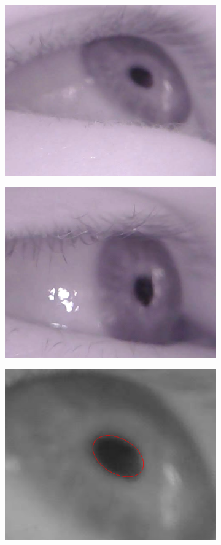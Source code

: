 \begin{figure}[h]
    \centering
    \begin{subfigure}{0.4\textwidth}
        \centering
        \includegraphics[width=0.8\linewidth]{plots/blurred_pupil.png} 
    \end{subfigure}
    \begin{subfigure}{0.4\textwidth}
        \centering
        \includegraphics[width=0.8\linewidth]{plots/blurred_pupil2.png} 
    \end{subfigure}
    \centering
    \begin{subfigure}{0.4\textwidth}
        \centering
        \includegraphics[width=0.8\linewidth]{plots/acwe/resultblurred1.png} 

\end{subfigure}
\end{figure}
